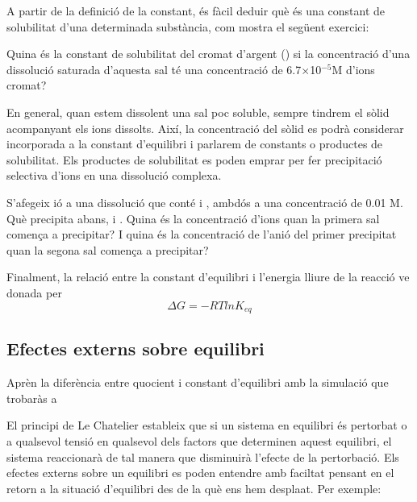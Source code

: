A partir de la definició de la constant, és fàcil deduir què és una constant de solubilitat d'una determinada substància, com mostra el següent exercici:

\begin{exr}
Quina és la constant de solubilitat del cromat d'argent () si la concentració d'una dissolució saturada d'aquesta sal té una concentració de 6.7$\times$10$^{-5}$M d'ions cromat?
\end{exr}

En general, quan estem dissolent una sal poc soluble, sempre tindrem el sòlid acompanyant els ions dissolts. Així, la concentració del sòlid es podrà considerar incorporada a la constant d'equilibri i parlarem de constants o productes de solubilitat.
Els productes de solubilitat es poden emprar per fer precipitació selectiva d'ions en una dissolució complexa. 

\begin{exr}
S'afegeix ió  a una dissolució que conté  i , ambdós a una concentració de 0.01 M. Què precipita abans,  i . Quina és la concentració d'ions  quan la primera sal comença a precipitar? I quina és la concentració de l'anió del primer precipitat quan la segona sal comença a precipitar?
\end{exr}

Finalment, la relació entre la constant d'equilibri i l'energia lliure de la reacció ve donada per
\[\Delta G = -RT ln K_{eq}\]

\subsection{Efectes externs sobre equilibri}

\begin{tcolorbox}[colback=green!5,colframe=green!40!black,title=Constant d'Equilibri]
Aprèn la diferència entre quocient i constant d'equilibri amb la simulació que trobaràs a 
\end{tcolorbox}

El principi de Le Chatelier estableix que si un sistema en equilibri és pertorbat o a qualsevol tensió en qualsevol dels factors que determinen aquest equilibri, el sistema reaccionarà de tal manera que disminuirà l'efecte de la pertorbació. 
 Els efectes externs sobre un equilibri es poden entendre amb faciltat pensant en el retorn a la situació d'equilibri des de la què ens hem desplaat. Per exemple:


